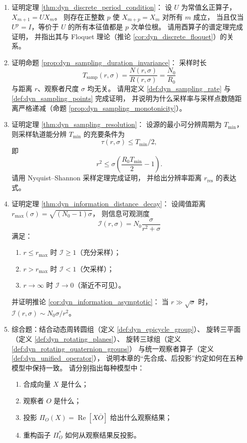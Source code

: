 \begin{enumerate}[leftmargin=3em, label=\textbf{题 \arabic*}]
    \item 证明定理 \ref{thm:dyn_discrete_period_condition}：
    设 $U$ 为常值幺正算子，$X_{m+1}=UX_m$。
    则存在正整数 $p$ 使 $X_{m+p}=X_m$ 对所有 $m$ 成立，
    当且仅当 $U^p=I$，等价于 $U$ 的所有本征值都是 $p$ 次单位根。
    请用酉算子的谱定理完成证明，
    并指出其与 Floquet 理论（推论 \ref{cor:dyn_discrete_floquet}）的关系。

    \item 证明命题 \ref{prop:dyn_sampling_duration_invariance}：
    采样时长
    \[
    T_{\text{samp}}(r,\sigma)=\frac{N(r,\sigma)}{R(r,\sigma)}=\frac{N_0}{R_0}
    \]
    与距离 $r$、观察者尺度 $\sigma$ 均无关。
    请用定义 \ref{def:dyn_sampling_rate} 与 \ref{def:dyn_sampling_points} 完成证明，
    并说明为什么采样率与采样点数随距离严格递减（命题 \ref{prop:dyn_sampling_monotonicity}）。

    \item 证明定理 \ref{thm:dyn_sampling_resolution}：
    设源的最小可分辨周期为 $T_{\min}$，
    则采样轨道能分辨 $T_{\min}$ 的充要条件为
    \[
    \tau(r,\sigma)\le T_{\min}/2,
    \]
    即
    \[
    r^2\le\sigma\left(\frac{R_0 T_{\min}}{2}-1\right).
    \]
    请用 Nyquist--Shannon 采样定理完成证明，
    并给出分辨率距离 $r_{\text{res}}$ 的表达式。

    \item 证明定理 \ref{thm:dyn_information_distance_decay}：
    设阈值距离 $r_{\max}(\sigma)=\sqrt{(N_0-1)\sigma}$，
    则信息可观测度
    \[
    \mathcal{I}(r,\sigma)=N_0\frac{\sigma}{r^2+\sigma}
    \]
    满足：
    \begin{enumerate}[label=(\roman*)]
        \item $r\le r_{\max}$ 时 $\mathcal{I}\ge1$（充分采样）；
        \item $r>r_{\max}$ 时 $\mathcal{I}<1$（欠采样）；
        \item $r\to\infty$ 时 $\mathcal{I}\to0$（渐近不可见）。
    \end{enumerate}
    并证明推论 \ref{cor:dyn_information_asymptotic}：
    当 $r\gg\sqrt{\sigma}$ 时，$\mathcal{I}(r,\sigma)\sim N_0\sigma/r^2$。

    \item 综合题：结合动态周转圆组（定义 \ref{def:dyn_epicycle_group}）、
    旋转三平面（定义 \ref{def:dyn_rotating_planes}）、
    旋转三球组（定义 \ref{def:dyn_rotating_quaternion_groups}）
    与统一观察者算子（定义 \ref{def:dyn_unified_operator}），
    说明本章的“先合成、后投影”约定如何在五种模型中保持一致。
    请分别指出每种模型中：
    \begin{enumerate}[label=(\roman*)]
        \item 合成向量 $X$ 是什么；
        \item 观察者 $O$ 是什么；
        \item 投影 $\Pi_O(X)=\operatorname{Re}[X\overline{O}]$ 给出什么观察结果；
        \item 重构函子 $\Pi_O^\ast$ 如何从观察结果反投影。
    \end{enumerate}


\end{enumerate}
